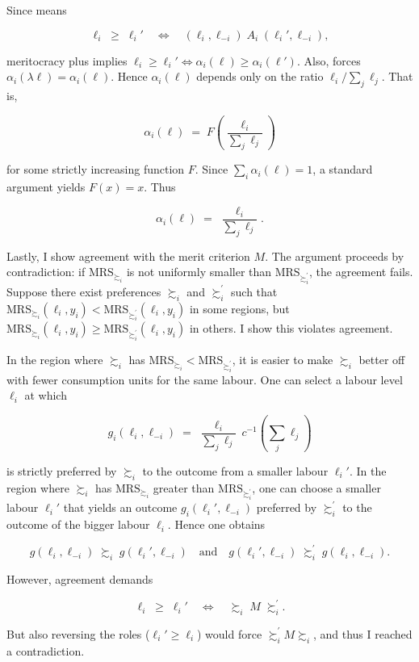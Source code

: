 \begin{propproof}
	Since  means

	\[
		\ell_i\;\ge\;\ell_i'
		\quad\Longleftrightarrow\quad
		(\ell_i,\ell_{-i}) \;A_i\; (\ell_i',\ell_{-i}),
	\]

	meritocracy plus  implies \(\ell_i\ge\ell_i'\iff\alpha_i(\ell)\ge\alpha_i(\ell')\). Also,  forces \(\alpha_i(\lambda\ell)=\alpha_i(\ell)\). Hence \(\alpha_i(\ell)\) depends only on the ratio \(\ell_i/\sum_j\ell_j\). That is,

	\[
		\alpha_i(\ell)
		\;=\;
		F \left( \frac{\ell_i}{\sum_j \ell_j} \right)
	\]

	for some strictly increasing function \(F\). Since \(\sum_i \alpha_i(\ell)=1\), a standard argument \citep[ch. 2 Th. 2]{aczelLecturesFunctionalEquations1966} yields \(F(x)=x\). Thus

	\[
		\alpha_i(\ell)
		\;=\;
		\frac{\ell_i}{\sum_j\ell_j}.
	\]

	Lastly, I show agreement with the merit criterion \( M \). The argument proceeds by contradiction: if \(\mathrm{MRS}_{\succsim_i}\) is not uniformly smaller than \(\mathrm{MRS}_{\succsim_i^{\prime}}\), the agreement fails. Suppose there exist preferences \(\succsim_i\) and \(\succsim_i^{\prime}\) such that \(\mathrm{MRS}_{\succsim_i}(\ell_i,y_i) < \mathrm{MRS}_{\succsim_i^{\prime}}(\ell_i,y_i)\) in some regions, but \(\mathrm{MRS}_{\succsim_i}(\ell_i,y_i) \ge \mathrm{MRS}_{\succsim_i^{\prime}}(\ell_i,y_i)\) in others. I show this violates agreement.

	In the region where \(\succsim_i\) has \(\mathrm{MRS}_{\succsim_i} < \mathrm{MRS}_{\succsim_i^{\prime}}\), it is easier to make \(\succsim_i\) better off with fewer consumption units for the same labour.  One can select a labour level \(\ell_i\) at which

	\[
		g_i(\ell_i,\ell_{-i})
		\;=\;
		\frac{\ell_i}{\sum_j\ell_j}\,c^{-1} \left( \sum_j\ell_j \right)
	\]

	is strictly preferred by \(\succsim_i\) to the outcome from a smaller labour \(\ell_i'\). In the region where \(\succsim_i\) has \(\mathrm{MRS}_{\succsim_i}\) greater than \(\mathrm{MRS}_{\succsim_i^{\prime}}\), one can choose a smaller labour \(\ell_i'\) that yields an outcome \(g_i(\ell_i',\ell_{-i})\) preferred by \(\succsim_i^{\prime}\) to the outcome of the bigger labour \(\ell_i\). Hence one obtains

	\[
		g(\ell_i,\ell_{-i})
		\; \succsim_i\;
		g(\ell_i',\ell_{-i})
		\quad\text{and}\quad
		g(\ell_i',\ell_{-i})
		\; \succsim_i^{\prime}\;
		g(\ell_i,\ell_{-i}) .
	\]

	However, agreement demands

	\[
		\ell_i \;\ge\;\ell_i'
		\quad\Longleftrightarrow\quad
		\succsim_i \;M\; \succsim_i^{\prime}.
	\]

	But also reversing the roles (\(\ell_i'\ge \ell_i\)) would force
	\(\succsim_i^{\prime}M \succsim_i\), and thus I reached a contradiction.

\end{propproof}

